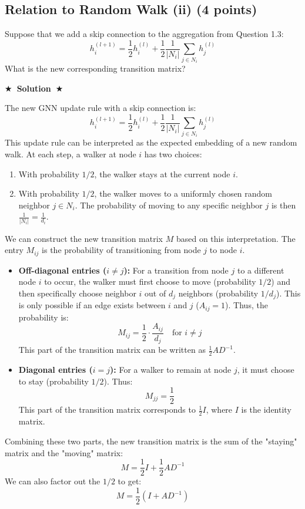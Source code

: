 \documentclass{article}
\numberwithin{figure}{section}
\newcommand{\Solution}[1]{%
	{%
		\medskip
		\color{red}
		\bf $\bigstar$~\sf\textbf{Solution}~$\bigstar$ \sf
		#1
	}
	\bigskip
}
\begin{document}
	
	\subsection{Relation to Random Walk (ii) (4 points)}
	
	Suppose that we add a skip connection to the aggregation from Question 1.3:
	$$h^{(l+1)}_i = \frac{1}{2}h^{(l)}_i + \frac{1}{2}\frac{1}{|N_i|} \sum_{j \in N_i} h^{(l)}_j$$
	What is the new corresponding transition matrix?
	
	\Solution{
		The new GNN update rule with a skip connection is:
		\[ h^{(l+1)}_i = \frac{1}{2}h^{(l)}_i + \frac{1}{2}\frac{1}{|N_i|} \sum_{j \in N_i} h^{(l)}_j \]
		This update rule can be interpreted as the expected embedding of a new random walk. At each step, a walker at node $i$ has two choices:
		\begin{enumerate}
			\item With probability $1/2$, the walker stays at the current node $i$.
			\item With probability $1/2$, the walker moves to a uniformly chosen random neighbor $j \in N_i$. The probability of moving to any specific neighbor $j$ is then $\frac{1}{|N_i|} = \frac{1}{d_i}$.
		\end{enumerate}
		
		We can construct the new transition matrix $M$ based on this interpretation. The entry $M_{ij}$ is the probability of transitioning from node $j$ to node $i$.
		
		\begin{itemize}
			\item \textbf{Off-diagonal entries ($i \neq j$):} For a transition from node $j$ to a different node $i$ to occur, the walker must first choose to move (probability $1/2$) and then specifically choose neighbor $i$ out of $d_j$ neighbors (probability $1/d_j$). This is only possible if an edge exists between $i$ and $j$ ($A_{ij}=1$). Thus, the probability is:
			\[ M_{ij} = \frac{1}{2} \cdot \frac{A_{ij}}{d_j} \quad \text{for } i \neq j \]
			This part of the transition matrix can be written as $\frac{1}{2} A D^{-1}$.
			
			\item \textbf{Diagonal entries ($i = j$):} For a walker to remain at node $j$, it must choose to stay (probability $1/2$). Thus:
			\[ M_{jj} = \frac{1}{2} \]
			This part of the transition matrix corresponds to $\frac{1}{2}I$, where $I$ is the identity matrix.
		\end{itemize}
		
		Combining these two parts, the new transition matrix is the sum of the "staying" matrix and the "moving" matrix:
		\[ M = \frac{1}{2}I + \frac{1}{2} A D^{-1} \]
		We can also factor out the $1/2$ to get:
		\[ M = \frac{1}{2} (I + A D^{-1}) \]
	}
	
\end{document}
